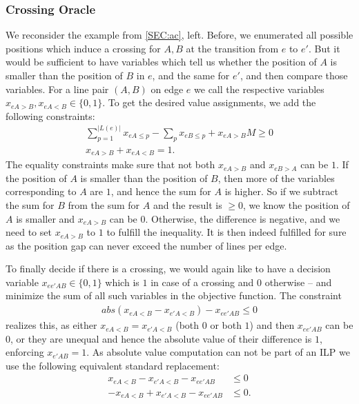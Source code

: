 \documentclass{llncs}
\begin{document}
\subsubsection{Crossing Oracle}
We reconsider the example from \ref{SEC:ac}, left. Before, we enumerated all possible positions which induce a crossing for $A, B$ at the transition from $e$ to $e'$. But it would be sufficient to have variables which tell us whether the position of $A$ is smaller than the position of $B$ in $e$, and the same for $e'$, and then compare those variables. For a line pair $(A,B)$ on edge $e$ we call the respective variables $x_{eA>B}, x_{eA<B} \in \{0, 1\}$. %
To get the desired value assignments, we add the following constraints:
\begin{gather}
	\sum_{p=1}^{|L(e)|} x_{eA\leq p} - \sum_{p} x_{eB\leq p} + x_{eA>B} M \geq 0 \\
	x_{eA>B} + x_{eA<B}=1.
\end{gather}
The equality constraints make sure that not both $x_{eA>B}$ and $x_{eB>A}$ can be $1$. If the position of $A$ is smaller than the position of $B$, then more of the variables corresponding to $A$ are $1$, and hence the sum for $A$ is higher. So if we subtract the sum for $B$ from the sum for $A$ and the result is $\geq 0$, we know the position of $A$ is  smaller and $x_{eA>B}$ can be $0$. Otherwise, the difference is negative, and we need to set $x_{eA>B}$ to $1$ to fulfill the inequality. It is then indeed fulfilled for sure as the position gap can never exceed the number of lines per edge.

To finally decide if there is a crossing, we would again like to have a decision variable $x_{ee'AB} \in \{0,1\}$ which is $1$ in case of a crossing and $0$ otherwise -- and minimize the sum of all such variables in the objective function.
The constraint
\begin{gather}
	abs(x_{eA<B}-x_{e'A<B}) - x_{ee'AB} \leq 0
\end{gather}
realizes this, as either $x_{eA<B} = x_{e'A<B}$ (both $0$ or both $1$) and then $x_{ee'AB}$ can be $0$, or they are unequal and hence the absolute value of their difference is $1$, enforcing $x_{e'AB}=1$. As absolute value computation can not be part of an ILP we use the following equivalent standard replacement:
\begin{align}
	x_{eA<B} - x_{e'A<B} - x_{ee'AB} &\leq 0 \label{EQ:abs_upper}\\
	-x_{eA<B} + x_{e'A<B} - x_{ee'AB} &\leq 0. \label{EQ:abs_lower}
\end{align}
\end{document}
